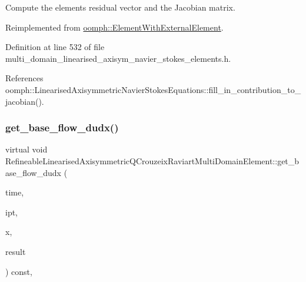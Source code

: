 Compute the element\textquotesingle{}s residual vector and the Jacobian matrix. 



Reimplemented from \hyperlink{classoomph_1_1ElementWithExternalElement_ae5fb09552a8271e891438f8d058ca1b8}{oomph\+::\+Element\+With\+External\+Element}.



Definition at line 532 of file multi\+\_\+domain\+\_\+linearised\+\_\+axisym\+\_\+navier\+\_\+stokes\+\_\+elements.\+h.



References oomph\+::\+Linearised\+Axisymmetric\+Navier\+Stokes\+Equations\+::fill\+\_\+in\+\_\+contribution\+\_\+to\+\_\+jacobian().

\mbox{\label{classRefineableLinearisedAxisymmetricQCrouzeixRaviartMultiDomainElement_aa188100d2012d19360e60d514089cdd4}} 
\subsubsection{\texorpdfstring{get\+\_\+base\+\_\+flow\+\_\+dudx()}{get\_base\_flow\_dudx()}}
{\footnotesize\ttfamily virtual void Refineable\+Linearised\+Axisymmetric\+Q\+Crouzeix\+Raviart\+Multi\+Domain\+Element\+::get\+\_\+base\+\_\+flow\+\_\+dudx (\begin{DoxyParamCaption}\item[{const double \&}]{time,  }\item[{const unsigned \&}]{ipt,  }\item[{const \hyperlink{classoomph_1_1Vector}{Vector}$<$ double $>$ \&}]{x,  }\item[{\hyperlink{classoomph_1_1DenseMatrix}{Dense\+Matrix}$<$ double $>$ \&}]{result }\end{DoxyParamCaption}) const\hspace{0.3cm}{\ttfamily [inline]}, {\ttfamily [virtual]}}



